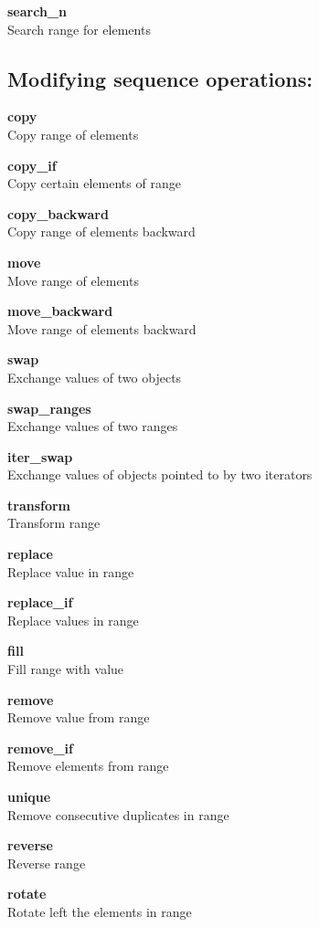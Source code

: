 \documentclass[table]{article}
\begin{document}
\begin{multicols}{2}
	\textbf{search\_n}\\
	Search range for elements
	
	\subsection*{Modifying sequence operations:}
	
	\textbf{copy}\\
	Copy range of elements
	
	\textbf{copy\_if}\\
	Copy certain elements of range
	
	\textbf{copy\_backward}\\
	Copy range of elements backward
	
	\textbf{move}\\
	Move range of elements
	
	\textbf{move\_backward}\\
	Move range of elements backward
	
	\textbf{swap}\\
	Exchange values of two objects
	
	\textbf{swap\_ranges}\\
	Exchange values of two ranges
	
	\textbf{iter\_swap}\\
	Exchange values of objects pointed to by two iterators
	
	\textbf{transform}\\
	Transform range
	
	\textbf{replace}\\
	Replace value in range
	
	\textbf{replace\_if}\\
	Replace values in range
	
	\textbf{fill}\\
	Fill range with value
	
	\textbf{remove}\\
	Remove value from range
	
	\textbf{remove\_if}\\
	Remove elements from range
	
	\textbf{unique}\\
	Remove consecutive duplicates in range
	
	\textbf{reverse}\\
	Reverse range
	
	\textbf{rotate}\\
	Rotate left the elements in range
	

\end{multicols}
\end{document}
